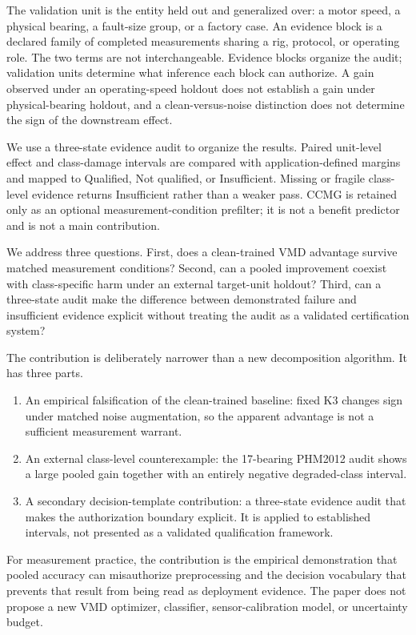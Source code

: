 \documentclass[11pt]{article}
\begin{document}
The validation unit is the entity held out and generalized over: a motor speed,
a physical bearing, a fault-size group, or a factory case. An evidence block is
a declared family of completed measurements sharing a rig, protocol, or
operating role. The two terms are not interchangeable. Evidence blocks organize
the audit; validation units determine what inference each block can authorize.
A gain observed under an operating-speed holdout does not establish a gain under
physical-bearing holdout, and a clean-versus-noise distinction does not
determine the sign of the downstream effect.

We use a three-state evidence audit to organize the results. Paired unit-level
effect and class-damage intervals are compared with application-defined margins
and mapped to Qualified, Not qualified, or Insufficient. Missing or fragile
class-level evidence returns Insufficient rather than a weaker pass. CCMG is
retained only as an optional measurement-condition prefilter; it is not a
benefit predictor and is not a main contribution.

We address three questions. First, does a clean-trained VMD advantage survive
matched measurement conditions? Second, can a pooled improvement coexist with
class-specific harm under an external target-unit holdout? Third, can a
three-state audit make the difference between demonstrated failure and
insufficient evidence explicit without treating the audit as a validated
certification system?

The contribution is deliberately narrower than a new decomposition algorithm.
It has three parts.

\begin{enumerate}
  \item An empirical falsification of the clean-trained baseline: fixed K3
  changes sign under matched noise augmentation, so the apparent advantage is
  not a sufficient measurement warrant.
  \item An external class-level counterexample: the 17-bearing PHM2012 audit
  shows a large pooled gain together with an entirely negative degraded-class
  interval.
  \item A secondary decision-template contribution: a three-state evidence
  audit that makes the authorization boundary explicit. It is applied to
  established intervals, not presented as a validated qualification framework.
\end{enumerate}

For measurement practice, the contribution is the empirical demonstration that
pooled accuracy can misauthorize preprocessing and the decision vocabulary that
prevents that result from being read as deployment evidence. The paper does not
propose a new VMD optimizer, classifier, sensor-calibration model, or
uncertainty budget.
\end{document}
